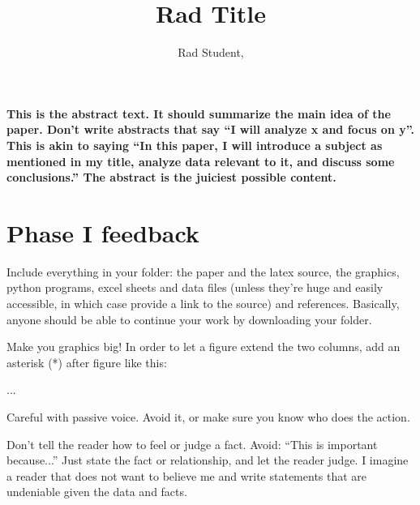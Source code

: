 \documentclass[11pt, twocolumn]{article}
\title{Rad Title} %
\author{Rad Student, } %
\date{} %
\begin{document}
\maketitle %

\thispagestyle{fancy} %


\noindent \textbf{This is the abstract text. It should summarize the main idea of the paper. Don't write abstracts that say ``I will analyze x and focus on y''. This is akin to saying ``In this paper, I will introduce a subject as mentioned in my title, analyze data relevant to it, and discuss some conclusions.'' The abstract is the juiciest possible content.}


\section*{Phase I feedback}
Include everything in your folder: the paper and the latex source, the graphics, python programs, excel sheets and data files (unless they're huge and easily accessible, in which case provide a link to the source) and references. Basically, anyone should be able to continue your work by downloading your folder.

Make you graphics big! In order to let a figure extend the two columns, add an asterisk (*) after figure like this:
\begin{verbatim*}
\begin{figure*}
...
\end{figure*}
\end{verbatim*}



Careful with passive voice. Avoid it, or make sure you know who does the action.

Don't tell the reader how to feel or judge a fact. Avoid: ``This is important because...'' Just state the fact or relationship, and let the reader judge. I imagine a reader that does not want to believe me and write statements that are undeniable given the data and facts.
\end{document}
